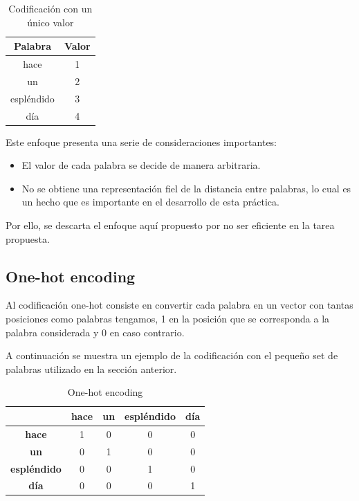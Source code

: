 \documentclass[12pt,a4paper, xcolor=table]{article}
\begin{document}
      \begin{table}[h]
        \centering
        \begin{tabular}{|c|c|}
        \hline
        \rowcolor[HTML]{DAE8FC}
        \textbf{Palabra} & \textbf{Valor} \\ \hline
        hace                    & 1   \\ \hline
        un                     & 2   \\ \hline
        espléndido                     & 3  \\ \hline
        día                       & 4   \\ \hline
        \end{tabular}
        \caption{Codificación con un único valor}
            \label{fig:graf_exp1}
    \end{table}
    
Este enfoque presenta una serie de consideraciones importantes:
\begin{itemize}
\item El valor de cada palabra se decide de manera arbitraria.
\item No se obtiene una representación fiel de la distancia entre palabras, lo cual es un hecho que es importante en el desarrollo de esta práctica.
\end{itemize}

Por ello, se descarta el enfoque aquí propuesto por no ser eficiente en la tarea propuesta.

\subsection{One-hot encoding}
Al codificación one-hot consiste en convertir cada palabra en un vector con tantas posiciones como palabras tengamos, 1 en la posición que se corresponda a la palabra considerada y 0 en caso contrario. 

\vspace{2mm}

A continuación se muestra un ejemplo de la codificación con el pequeño set de palabras utilizado en la sección anterior.

  \begin{table}[h]
        \centering
        \begin{tabular}{|c|c|c|c|c|}
        \hline
        \textbf{} &\textbf{hace} & \textbf{un} & \textbf{espléndido} & \textbf{día}  \\ \hline
        \textbf{hace}                     & 1 & 0 & 0 & 0\\ \hline
        \textbf{un}                       & 0 & 1 & 0 & 0\\ \hline
        \textbf{espléndido}               & 0 & 0 & 1 & 0\\ \hline
        \textbf{día}                      & 0 & 0 & 0 & 1\\ \hline
        \end{tabular}
        \caption{One-hot encoding}
            \label{fig:graf_exp1}
    \end{table}
\end{document}
